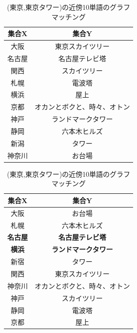 \begin{table}[!h]
  \begin{minipage}[t]{.45\textwidth}
    \caption[(東京,東京タワー)の近傍10単語]{(東京,東京タワー)の近傍10単語}
    \label{}
    \begin{center}
      \begin{tabular}{|c||c|} \hline
        集合X & 集合Y \\ \hline \hline
        大阪 & 東京スカイツリー \\
        名古屋 & 名古屋テレビ塔 \\
        関西 & スカイツリー \\
        札幌 & 電波塔 \\
        横浜 & 屋上 \\
        京都 & オカンとボクと、時々、オトン \\
        神戸 & ランドマークタワー \\
        静岡 & 六本木ヒルズ \\
        新潟 & タワー \\
        神奈川 & お台場 \\ \hline
      \end{tabular}
    \end{center}
  \end{minipage}
  \hfill
  \begin{minipage}[t]{.45\textwidth}
    \caption[(東京,東京タワー)の近傍10単語のグラフマッチング]{(東京,東京タワー)の近傍10単語のグラフマッチング}
    \label{}
    \begin{center}
      \begin{tabular}{|c||c|} \hline
        集合X & 集合Y \\ \hline \hline
        大阪 & お台場 \\
        札幌 & 六本木ヒルズ \\
        \textbf{名古屋} & \textbf{名古屋テレビ塔} \\
        \textbf{横浜} & \textbf{ランドマークタワー} \\
        新宿 & タワー \\
        関西 & 東京スカイツリー \\
        神奈川 & オカンとボクと、時々、オトン \\
        神戸 & スカイツリー \\
        静岡 & 電波塔 \\
        京都 & 屋上 \\ \hline
      \end{tabular}
    \end{center}
  \end{minipage}
\end{table}


